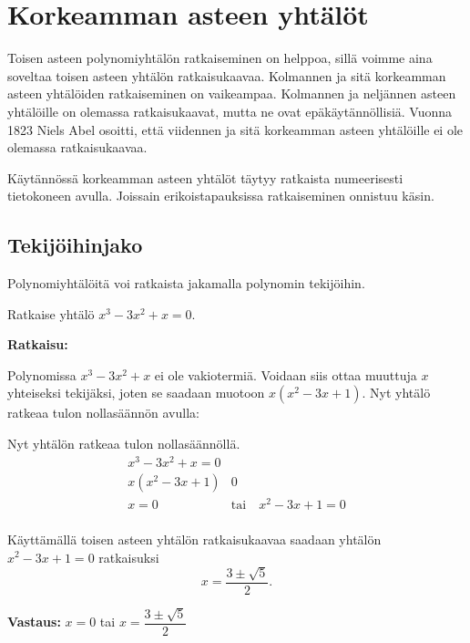 \section{Korkeamman asteen yhtälöt}
Toisen asteen polynomiyhtälön ratkaiseminen on helppoa, sillä voimme aina soveltaa toisen asteen yhtälön ratkaisukaavaa.
Kolmannen ja sitä korkeamman asteen yhtälöiden ratkaiseminen on vaikeampaa.
Kolmannen ja neljännen asteen yhtälöille on olemassa ratkaisukaavat, mutta ne ovat epäkäytännöllisiä.
Vuonna 1823 Niels Abel osoitti, että viidennen ja sitä korkeamman asteen yhtälöille ei ole olemassa ratkaisukaavaa.

Käytännössä korkeamman asteen yhtälöt täytyy ratkaista numeerisesti tietokoneen avulla. Joissain erikoistapauksissa ratkaiseminen onnistuu käsin.

\subsection*{Tekijöihinjako}

Polynomiyhtälöitä voi ratkaista jakamalla polynomin tekijöihin.


\begin{esimerkki}
Ratkaise yhtälö $x^3 - 3x^2 + x = 0$.

\textbf{Ratkaisu:}

Polynomissa $x^3 - 3x^2 + x$ ei ole vakiotermiä. Voidaan siis ottaa muuttuja $x$ yhteiseksi tekijäksi, joten se saadaan muotoon $x(x^2 - 3x + 1)$. Nyt yhtälö ratkeaa tulon nollasäännön avulla:

Nyt yhtälön ratkeaa tulon nollasäännöllä.
\begin{align*}
x^3 - 3x^2 + x=0 \\
x(x^2 - 3x + 1)&0 \\
x= 0 \quad &\text{tai} \quad x^2 - 3x + 1 = 0 \\
\end{align*}

Käyttämällä toisen asteen yhtälön ratkaisukaavaa saadaan yhtälön $x^2 - 3x + 1 = 0$ ratkaisuksi
\[x = \frac{3\pm \sqrt{5}}{2}.\]

\textbf{Vastaus:}
$x= 0$ tai $x=\dfrac{3\pm \sqrt{5}}{2}$
\end{esimerkki}

